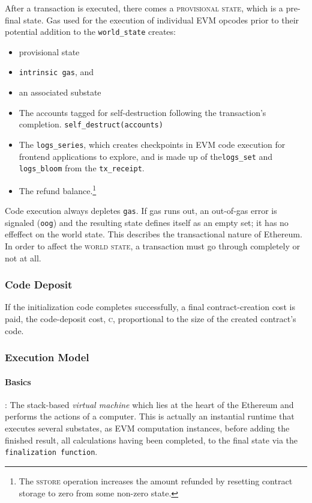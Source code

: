 \documentclass[10pt,letterpaper,leqno,bibliography=totoc]{scrartcl}
\newenvironment{alphafootnotes}
{\par\edef\savedfootnotenumber{\number\value{footnote}}
\renewcommand{\thefootnote}{\alph{footnote}}
\setcounter{footnote}{0}}
{\par\setcounter{footnote}{\savedfootnotenumber}}
\begin{document}
\begin{alphafootnotes}
\begin{multicols*}{2}
			After a transaction is executed, there comes a \textsc{provisional state}, which is a pre-final state. Gas used for the execution of individual EVM opcodes prior to their potential addition to the \texttt{world\_state} creates:
			
		\begin{itemize}
			\item provisional state
			\item \texttt{intrinsic gas}, and
			\item an associated substate  
		\end{itemize}
		
		\begin{itemize}
        		\item The accounts tagged for self-destruction following the transaction's completion. \texttt{self\_destruct(accounts)}
        		\item The \texttt{logs\_series}, which creates checkpoints in EVM code execution for frontend applications to explore, and is made up of the\texttt{logs\_set} and \texttt{logs\_bloom} from the \texttt{tx\_receipt}.
			\item The refund balance.\footnote{The \textsc{sstore} operation increases the amount refunded by resetting contract storage to zero from some non-zero state.}
		\end{itemize}

		Code execution always depletes \texttt{gas}. If gas runs out, an out-of-gas error is signaled (\texttt{oog}) and the resulting state defines itself as an empty set; it has no effeffect on the world state. This describes the transactional nature of Ethereum. In order to affect the \textsc{world state}, a transaction must go through completely or not at all. 

				\subsubsection{Code Deposit}
				If the initialization code completes successfully, a final contract-creation cost is paid, the code-deposit cost, \textsc{c}, proportional to the size of the created contract's code. 
	
				\subsubsection{Execution Model}
				\paragraph{Basics}: The stack-based \textsl{virtual machine} which lies at the heart of the Ethereum and performs the actions of a computer. This is actually an instantial runtime that executes several substates, as EVM computation instances, before adding the finished result, all calculations having been completed, to the final state  via the \texttt{finalization function}. 
	

\end{multicols*}
\end{alphafootnotes}
\end{document}
